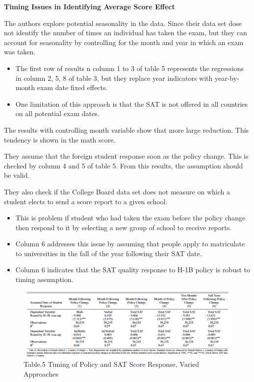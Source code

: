 \documentclass[../root]{subfiles}
\begin{document}
   {\bf Timing Issues in Identifying Average Score Effect}
   
   The authors explore potential seasonality in the data. Since their data set dose not identify the number of times an individual has taken the exam, but they can account for seasonality by controlling for the month and year in which an exam was taken.
   
   \begin{itemize}
       \item The first row of results n column 1 to 3 of table 5 represents the regressions in column 2, 5, 8 of table 3, but they replace year indicators with year-by-month exam date fixed effects.
       \item One limitation of this approach is that the SAT is not offered in all countries on all potential exam dates.
   \end{itemize}
   
   The results with controlling month variable show that more large reduction. This tendency is shown in the math score.
   
   
   They assume that the foreign student response soon as the policy change. This is checked by column 4 and 5 of table 5. From this results, the assumption should be valid.
   
   They also check if the College Board data set does not measure on which a student elects to send a score report to a given school.
   
   \begin{itemize}
       \item This is problem if student who had taken the exam before the policy change then respond to it by selecting a new group of school to receive reports.
       \item Column 6 addresses this issue by assuming that people apply to matriculate to universities in the fall of the year following their SAT date.
       \item Column 6 indicates that the SAT quality response to H-1B policy is robust to timing assumption. 
   \end{itemize}
   
   \begin{figure}
        \centering
        \includegraphics[width = \linewidth]{1016sugiyama/Table_5.png}
        \caption{Table.5 Timing of Policy and SAT Score Response, Varied Approaches}
        \label{fig:my_label}
    \end{figure}
    
\end{document}
